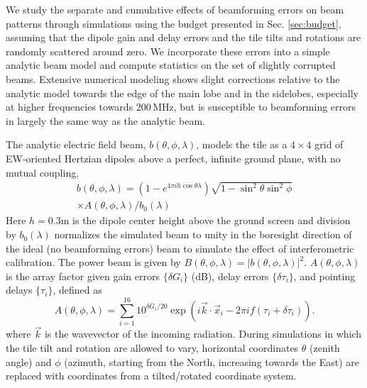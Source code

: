 We study the separate and cumulative effects of beamforming errors on beam patterns through simulations using the budget presented in Sec. \ref{sec:budget}, assuming that the dipole gain and delay errors and the tile tilts and rotations are randomly scattered around zero. We incorporate these errors into a simple analytic beam model and compute statistics on the set of slightly corrupted beams. Extensive numerical modeling \citep{sutinjo15} shows slight corrections relative to the analytic model towards the edge of the main lobe and in the sidelobes, especially at higher frequencies towards 200\,MHz, but is susceptible to beamforming errors in largely the same way as the analytic beam. 

The analytic electric field beam, $b(\theta,\phi,\lambda)$, models the tile as a $4\times4$ grid of EW-oriented Hertzian dipoles above a perfect, infinite ground plane, with no mutual coupling,
\begin{eqnarray}
\label{eqn:analyticbeam}
b(\theta,\phi,\lambda)=(1-e^{4\pi i h\cos\theta\lambda})\sqrt{1-\sin^2\theta\sin^2\phi}\nonumber\\
\times A(\theta,\phi,\lambda)/b_0(\lambda)
\end{eqnarray}
Here $h=0.3$m is the dipole center height above the ground screen and division by $b_0(\lambda)$ normalizes the simulated beam to unity in the boresight direction of the ideal (no beamforming errors) beam to simulate the effect of interferometric calibration. The power beam is given by $B(\theta,\phi,\lambda)=|b(\theta,\phi,\lambda)|^2$. $A(\theta,\phi,\lambda)$ is the array factor given gain errors $\{\delta G_i\}$ (dB), delay errors $\{\delta\tau_i\}$, and pointing delays $\{\tau_i\}$, defined as
\begin{equation}
A(\theta,\phi,\lambda)=\sum_{i=1}^{16}10^{\delta G_i/20}\exp(i \vec{k}\cdot \vec{x}_i-2\pi i f(\tau_i+\delta\tau_i)).
\end{equation}
where $\vec{k}$ is the wavevector of the incoming radiation. During simulations in which the tile tilt and rotation are allowed to vary, horizontal coordinates $\theta$ (zenith angle) and $\phi$ (azimuth, starting from the North, increasing towards the East) are replaced with coordinates from a tilted/rotated coordinate system.

